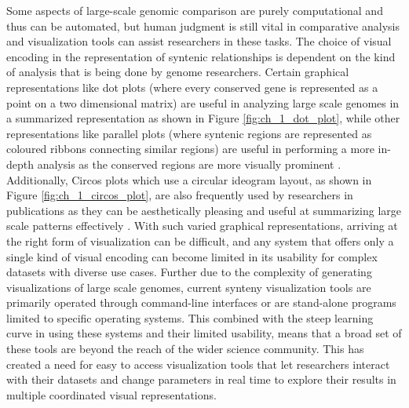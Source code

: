 Some aspects of large-scale genomic comparison are purely computational and thus can be automated, but human judgment is still vital in comparative analysis and visualization tools can assist researchers in these tasks. The choice of visual encoding in the representation of syntenic relationships is dependent on the kind of analysis that is being done by genome researchers. Certain graphical representations like dot plots (where every conserved gene is represented as a point on a two dimensional matrix) are useful in analyzing large scale genomes in a summarized representation as shown in Figure \ref{fig:ch_1_dot_plot}, while other representations like parallel plots (where syntenic regions are represented as coloured ribbons connecting similar regions) are useful in performing a more in-depth analysis as the conserved regions are more visually prominent \cite{nusrat2019tasks}. Additionally, Circos plots which use a circular ideogram layout, as shown in Figure \ref{fig:ch_1_circos_plot}, are also frequently used by researchers in publications as they can be aesthetically pleasing and useful at summarizing large scale patterns effectively \cite{krzywinski2009circos}. With such varied graphical representations, arriving at the right form of visualization can be difficult, and any system that offers only a single kind of visual encoding can become limited in its usability for complex datasets with diverse use cases. Further due to the complexity of generating visualizations of large scale genomes, current synteny visualization tools are primarily operated through command-line interfaces or are stand-alone programs limited to specific operating systems. This combined with the steep learning curve in using these systems and their limited usability, means that a broad set of these tools are beyond the reach of the wider science community. This has created a need for easy to access visualization tools that let researchers interact with their datasets and change parameters in real time to explore their results in multiple coordinated visual representations.

